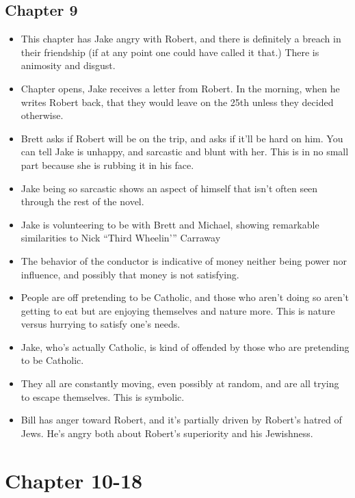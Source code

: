 \documentclass[11pt]{article}
\begin{document}
\subsection{Chapter 9}
\begin{itemize}
	\item This chapter has Jake angry with Robert, and there is definitely a 
		breach in their friendship (if at any point one could have called it
		that.)  There is animosity and disgust.
	\item Chapter opens, Jake receives a letter from Robert.  In the morning,
		when he writes Robert back, that they would leave on the 25th unless
		they decided otherwise.
	\item Brett asks if Robert will be on the trip, and asks if it'll be hard
		on him.  You can tell Jake is unhappy, and sarcastic and blunt with her.
		This is in no small part because she is rubbing it in his face.
	\item Jake being so sarcastic shows an aspect of himself that isn't often
		seen through the rest of the novel.
	\item Jake is volunteering to be with Brett and Michael, showing remarkable
		similarities to Nick ``Third Wheelin{'}'' Carraway
	\item The behavior of the conductor is indicative of money neither being
		power nor influence, and possibly that money is not satisfying.  
	\item People are off pretending to be Catholic, and those who aren't 
		doing so aren't getting to eat but are enjoying themselves and nature
		more.  This is nature versus hurrying to satisfy one's needs.
	\item Jake, who's actually Catholic, is kind of offended by those who are
		pretending to be Catholic.
	\item They all are constantly moving, even possibly at random, and are all
		trying to escape themselves.  This is symbolic.
	\item Bill has anger toward Robert, and it's partially driven by Robert's
		hatred of Jews.  He's angry both about Robert's superiority and his
		Jewishness.
	\end{itemize}
\section{Chapter 10-18}
\end{document}
